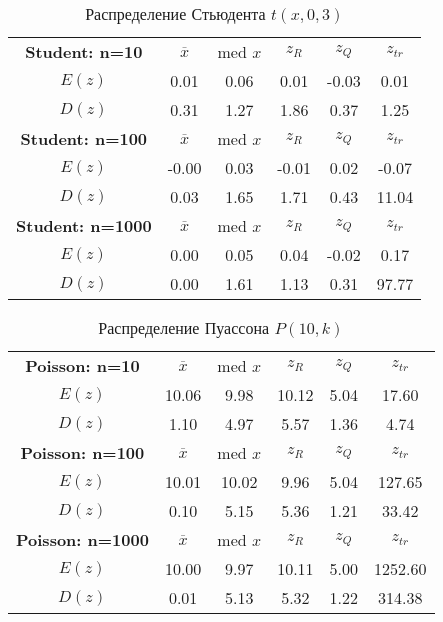 \documentclass[14pt]{extarticle}
\begin{document}
\begin{table}[htbp]
    \centering
    \begin{tabular}{|c|c|c|c|c|c|}
        \toprule
        \textbf{Student: n=10} & \(\overline{x}\) & med \( x\) & \(z_R\) & \(z_Q\) & \(z_{tr}\)\\
        \(E(z)\) & 0.01 & 0.06 & 0.01 & -0.03 & 0.01  \\
        \(D(z)\) & 0.31 & 1.27 & 1.86 & 0.37 & 1.25 \\
        \midrule
  	\textbf{Student: n=100} & \(\overline{x}\) & med \( x\) & \(z_R\) & \(z_Q\) & \(z_{tr}\)\\
        \(E(z)\) & -0.00 & 0.03 & -0.01 & 0.02 & -0.07   \\
        \(D(z)\) & 0.03 & 1.65 & 1.71 & 0.43 & 11.04 \\
        \midrule
	\textbf{Student: n=1000} & \(\overline{x}\) & med \( x\) & \(z_R\) & \(z_Q\) & \(z_{tr}\)\\
        \(E(z)\) & 0.00 & 0.05 & 0.04 & -0.02 & 0.17  \\
        \(D(z)\) & 0.00 & 1.61 & 1.13 & 0.31 & 97.77  \\
        \toprule
    \end{tabular}
    \caption{Распределение Стьюдента \(t(x, 0, 3)\)}
    \label{tab:student_t}
\end{table}

\begin{table}[htbp]
    \centering
    \begin{tabular}{|c|c|c|c|c|c|}
        \toprule
        \textbf{Poisson: n=10} & \(\overline{x}\) & med \(x\) & \(z_R\) & \(z_Q\) & \(z_{tr}\)\\
        \(E(z)\) & 10.06 & 9.98 & 10.12 & 5.04 & 17.60  \\
        \(D(z)\) & 1.10 & 4.97 & 5.57 & 1.36 & 4.74 \\
        \midrule
  	\textbf{Poisson: n=100} & \(\overline{x}\) & med \(x\) & \(z_R\) & \(z_Q\) & \(z_{tr}\)\\
        \(E(z)\) & 10.01 & 10.02 & 9.96 & 5.04 & 127.65    \\
        \(D(z)\) & 0.10 & 5.15 & 5.36 & 1.21 & 33.42 \\
        \midrule
	\textbf{Poisson: n=1000} & \(\overline{x}\) & med \(x\) & \(z_R\) & \(z_Q\) & \(z_{tr}\)\\
        \(E(z)\) & 10.00 & 9.97 & 10.11 & 5.00 & 1252.60  \\
        \(D(z)\) & 0.01 & 5.13 & 5.32 & 1.22 & 314.38 \\
        \toprule
    \end{tabular}
    \caption{Распределение Пуассона \(P(10, k)\)}
    \label{tab:poisson_t}
\end{table}
\end{document}
